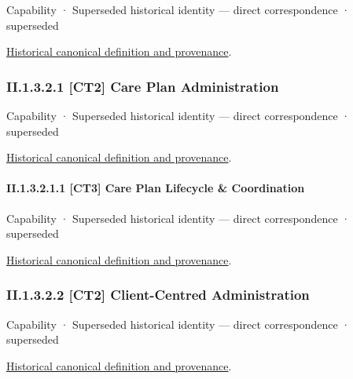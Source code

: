 \label{element:b611a1fcfadb4b30af9ba74a4c993d8a}
{\small Capability · Superseded historical identity — direct correspondence · superseded}\par
\href{../../../../continuum/strategy/capability/b611a1fcfadb4b30af9ba74a4c993d8a.md}{Historical canonical definition and provenance}.\par
\subsubsection*{II.1.3.2.1 [CT2] Care Plan Administration}
\label{navigation:II.1.3.2.1}

\label{element:e31407cea7624632a8ed2dc53b09d726}
{\small Capability · Superseded historical identity — direct correspondence · superseded}\par
\href{../../../../continuum/strategy/capability/e31407cea7624632a8ed2dc53b09d726.md}{Historical canonical definition and provenance}.\par
\paragraph*{II.1.3.2.1.1 [CT3] Care Plan Lifecycle \& Coordination}
\label{navigation:II.1.3.2.1.1}

\label{element:689bb3f8a24249b79f787e1f48eb268d}
{\small Capability · Superseded historical identity — direct correspondence · superseded}\par
\href{../../../../continuum/strategy/capability/689bb3f8a24249b79f787e1f48eb268d.md}{Historical canonical definition and provenance}.\par
\subsubsection*{II.1.3.2.2 [CT2] Client-Centred Administration}
\label{navigation:II.1.3.2.2}

\label{element:232b3fb2ff204c9b9ff7a60ff6a7a32d}
{\small Capability · Superseded historical identity — direct correspondence · superseded}\par
\href{../../../../continuum/strategy/capability/232b3fb2ff204c9b9ff7a60ff6a7a32d.md}{Historical canonical definition and provenance}.\par
